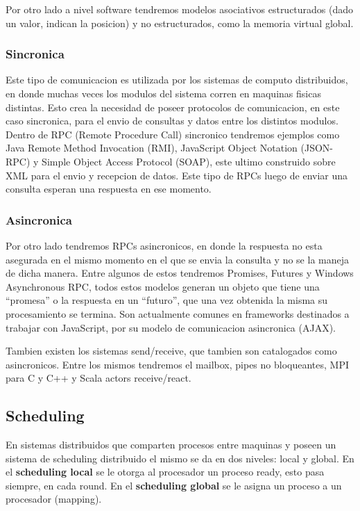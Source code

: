 \documentclass{article}
\begin{document}
Por otro lado a nivel software tendremos modelos asociativos estructurados (dado un valor, indican la posicion) y no estructurados, como la memoria virtual global.

\subsubsection{Sincronica}

Este tipo de comunicacion es utilizada por los sistemas de computo distribuidos, en donde muchas veces los modulos del sistema corren en maquinas fisicas distintas. Esto crea la necesidad de poseer protocolos de comunicacion, en este caso sincronica, para el envio de consultas y datos entre los distintos modulos. Dentro de RPC (Remote Procedure Call) sincronico tendremos ejemplos como Java Remote Method Invocation (RMI), JavaScript Object Notation (JSON-RPC) y Simple Object Access Protocol (SOAP), este ultimo construido sobre XML para el envio y recepcion de datos. Este tipo de RPCs luego de enviar una consulta esperan una respuesta en ese momento.

\subsubsection{Asincronica}

Por otro lado tendremos RPCs asincronicos, en donde la respuesta no esta asegurada en el mismo momento en el que se envia la consulta y no se la maneja de dicha manera. Entre algunos de estos tendremos Promises, Futures y Windows Asynchronous RPC, todos estos modelos generan un objeto que tiene una ``promesa'' o la respuesta en un ``futuro'', que una vez obtenida la misma su procesamiento se termina. Son actualmente comunes en frameworks destinados a trabajar con JavaScript, por su modelo de comunicacion asincronica (AJAX).

Tambien existen los sistemas send/receive, que tambien son catalogados como asincronicos. Entre los mismos tendremos el mailbox, pipes no bloqueantes, MPI para C y C++ y Scala actors receive/react.

\subsection{Scheduling}

En sistemas distribuidos que comparten procesos entre maquinas y poseen un sistema de scheduling distribuido el mismo se da en dos niveles: local y global. En el \textbf{scheduling local} se le otorga al procesador un proceso ready, esto pasa siempre, en cada round. En el \textbf{scheduling global} se le asigna un proceso a un procesador (mapping).
\end{document}
